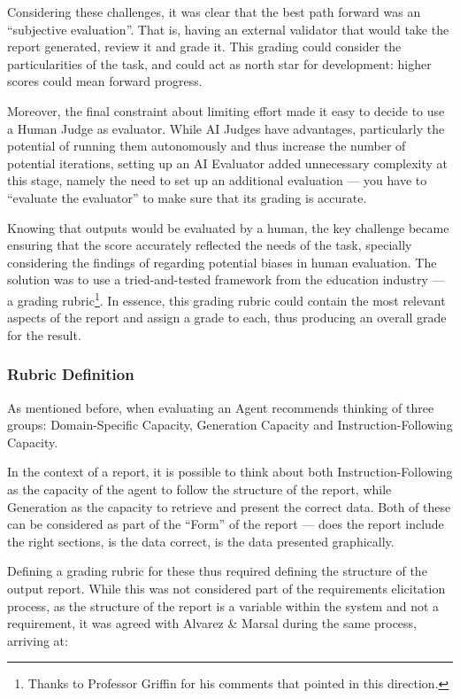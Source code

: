 \documentclass[a4paper]{report}
\begin{document}
Considering these challenges, it was clear that the best path forward was an ``subjective evaluation''. That is, having an external validator that would take the report generated, review it and grade it. This grading could consider the particularities of the task, and could act as north star for development: higher scores could mean forward progress.

Moreover, the final constraint about limiting effort made it easy to decide to use a Human Judge as evaluator. While AI Judges have advantages, particularly the potential of running them autonomously and thus increase the number of potential iterations, setting up an AI Evaluator added unnecessary complexity at this stage, namely the need to set up an additional evaluation --- you have to ``evaluate the evaluator'' to make sure that its grading is accurate.

Knowing that outputs would be evaluated by a human, the key challenge became ensuring that the score accurately reflected the needs of the task, specially considering the findings of \cite{hu2023decipher} regarding potential biases in human evaluation. The solution was to use a tried-and-tested framework from the education industry --- a grading rubric\footnote{Thanks to Professor Griffin for his comments that pointed in this direction.}. In essence, this grading rubric could contain the most relevant aspects of the report and assign a grade to each, thus producing an overall grade for the result. 

\subsubsection{Rubric Definition}

As mentioned before, when evaluating an Agent \cite{aiebook2025} recommends thinking of three groups: Domain-Specific Capacity, Generation Capacity and Instruction-Following Capacity.

In the context of a report, it is possible to think about both Instruction-Following as the capacity of the agent to follow the structure of the report, while Generation as the capacity to retrieve and present the correct data. Both of these can be considered as part of the ``Form'' of the report --- does the report include the right sections, is the data correct, is the data presented graphically.

Defining a grading rubric for these thus required defining the structure of the output report. While this was not considered part of the requirements elicitation process, as the structure of the report is a variable within the system and not a requirement, it was agreed with Alvarez \& Marsal during the same process, arriving at:
\end{document}
